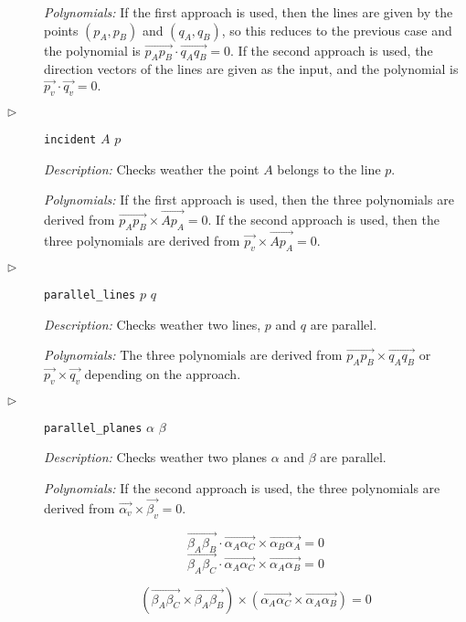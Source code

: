 \documentclass[final,1p,times,authoryear]{elsarticle}
\begin{document}
\begin{description}
{\em Polynomials:} If the first approach is used, then the lines are
given by the points $(p_A, p_B)$ and $(q_A, q_B)$, so this reduces to
the previous case and the polynomial is
$\overrightarrow{p_Ap_B} \cdot \overrightarrow{q_Aq_B} = 0$. If the
second approach is used, the direction vectors of the lines are given
as the input, and the polynomial is
$\overrightarrow{p_v} \cdot \overrightarrow{q_v} = 0.$

\item[$\triangleright$] {\tt incident} $A$ $p$

{\em Description:} Checks weather the point $A$ belongs to the line
$p$.

{\em Polynomials:} If the first approach is used, then the three
polynomials are derived from
$\overrightarrow{p_Ap_B} \times \overrightarrow{Ap_A} = 0$. If the
second approach is used, then the three polynomials are derived from
$\overrightarrow{p_v} \times \overrightarrow{Ap_A} = 0.$

\item[$\triangleright$] {\tt parallel\_lines} $p$ $q$

{\em Description:} Checks weather two lines, $p$ and $q$ are parallel.

{\em Polynomials:} The three polynomials are derived from
$\overrightarrow{p_Ap_B} \times \overrightarrow{q_Aq_B}$ or
$\overrightarrow{p_v} \times \overrightarrow{q_v}$ depending on the
approach.

\item[$\triangleright$] {\tt parallel\_planes} $\alpha$ $\beta$

{\em Description:} Checks weather two planes $\alpha$ and $\beta$ are
parallel.

{\em Polynomials:} If the second approach is used, the three
polynomials are derived from
$\overrightarrow{\alpha_v} \times \overrightarrow{\beta_v} = 0.$



$$\overrightarrow{\beta_A\beta_B}\cdot \overrightarrow{\alpha_A\alpha_C} \times \overrightarrow{\alpha_B\alpha_A} = 0$$
$$\overrightarrow{\beta_A\beta_C}\cdot \overrightarrow{\alpha_A\alpha_C} \times \overrightarrow{\alpha_A\alpha_B} = 0$$

$$(\overrightarrow{\beta_A\beta_C}\times\overrightarrow{\beta_A\beta_B}) \times (\overrightarrow{\alpha_A\alpha_C} \times \overrightarrow{\alpha_A\alpha_B}) = 0$$



\end{description}
\end{document}
